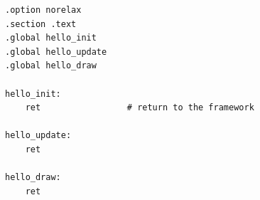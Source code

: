 \begin{lstlisting}[style=asm,caption={The smallest \prg assembly game: three functions that return immediately. Build it, confirm it runs, then add to it.}]
.option norelax
.section .text
.global hello_init
.global hello_update
.global hello_draw

hello_init:
    ret                 # return to the framework

hello_update:
    ret

hello_draw:
    ret
\end{lstlisting}